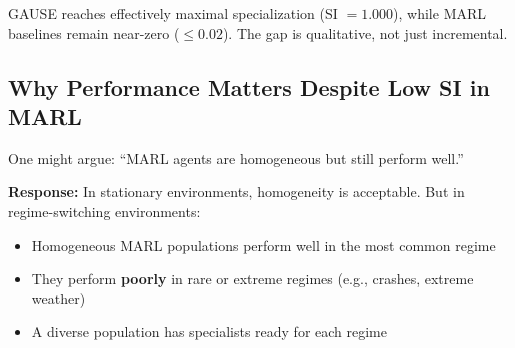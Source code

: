 \documentclass[11pt,a4paper]{article}
\theoremstyle{definition}
\theoremstyle{plain}
\begin{document}
\begin{keypoint}
GAUSE reaches effectively maximal specialization (SI $=1.000$), while
MARL baselines remain near-zero ($\leq 0.02$). The gap is qualitative, not just
incremental.
\end{keypoint}

\subsection{Why Performance Matters Despite Low SI in MARL}

One might argue: ``MARL agents are homogeneous but still perform well.''

\textbf{Response:} In stationary environments, homogeneity is acceptable. But in regime-switching environments:
\begin{itemize}
    \item Homogeneous MARL populations perform well in the most common regime
    \item They perform \textbf{poorly} in rare or extreme regimes (e.g., crashes, extreme weather)
    \item A diverse population has specialists ready for each regime
\end{itemize}
\end{document}
